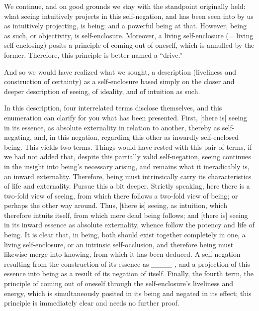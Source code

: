 We continue, and on good grounds
we stay with the standpoint originally held:
what seeing intuitively projects in this self-negation,
and has been seen into by us as intuitively projecting,
is being; and a powerful being at that.
However, being as such, or objectivity, is self-enclosure.
Moreover, a living self-enclosure (= living self-enclosing)
posits a principle of coming out of oneself,
which is annulled by the former.
Therefore, this principle is better named a “drive.”

And so we would have realized what we sought,
a description (liveliness and construction of certainty)
as a self-enclosure based simply on
the closer and deeper description of seeing,
of ideality, and of intuition as such.

In this description, four interrelated terms disclose themselves,
and this enumeration can clarify for you what has been presented.
First, [there is] seeing in its essence,
as absolute externality in relation to another,
thereby as self-negating, and, in this negation,
regarding this other as inwardly self-enclosed being.
This yields two terms.
Things would have rested with this pair of terms,
if we had not added that,
despite this partially valid self-negation,
seeing continues in the insight
into being’s necessary arising,
and remains what it ineradicably is,
an inward externality.
Therefore, being must intrinsically carry
its characteristics of life and externality.
Pursue this a bit deeper.
Strictly speaking, here there is
a two-fold view of seeing,
from which there follows
a two-fold view of being;
or perhaps the other way around.
Thus, [there is] seeing, as intuition,
which therefore intuits itself,
from which mere dead being follows;
and [there is] seeing in its inward essence
as absolute externality,
whence follow the potency and life of being.
It is clear that, in being,
both should exist together completely in one,
a living self-enclosure,
or an intrinsic self-occlusion,
and therefore being must likewise
merge into knowing,
from which it has been deduced.
A self-negation resulting from
the construction of its essence as ____ ,
and a projection of this essence into being
as a result of its negation of itself.
Finally, the fourth term,
the principle of coming out of oneself
through the self-enclosure’s liveliness and energy,
which is simultaneously
posited in its being
and negated in its effect;
this principle is immediately clear
and needs no further proof.

